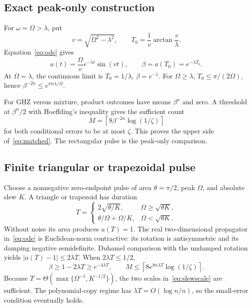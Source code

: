 \documentclass[11pt,a4paper]{article}
\begin{document}
\subsection{Exact peak-only construction}
For $\omega=\Omega>\lambda$, put
\begin{equation}
 v=\sqrt{\Omega^2-\lambda^2},\qquad
 T_0=\frac1v\arctan\frac v\lambda.
\end{equation}
Equation~\eqref{eq:ode} gives
\begin{equation}
 a(t)=\frac\Omega v e^{-\lambda t}\sin(vt),\qquad
 \boxed{\beta=a(T_0)=e^{-\lambda T_0}.}
\end{equation}
At $\Omega=\lambda$, the continuous limit is $T_0=1/\lambda$, $\beta=e^{-1}$. For $\Omega\ge\lambda$, $T_0\le\pi/(2\Omega)$, hence $\beta^{-2n}\le e^{\pi n\lambda/\Omega}$.

For GHZ versus mixture, product outcomes have means $\beta^n$ and zero. A threshold at $\beta^n/2$ with Hoeffding's inequality gives the sufficient count
\begin{equation}
 M=\left\lceil8\beta^{-2n}\log(1/\zeta)\right\rceil
 \label{eq:upper}
\end{equation}
for both conditional errors to be at most $\zeta$. This proves the upper side of~\eqref{eq:matched}. The rectangular pulse is the peak-only comparison.

\subsection{Finite triangular or trapezoidal pulse}
Choose a nonnegative zero-endpoint pulse of area $\theta=\pi/2$, peak $\Omega$, and absolute slew $K$. A triangle or trapezoid has duration
\begin{equation}
 T=
 \begin{cases}
 2\sqrt{\theta/K},&\Omega\ge\sqrt{\theta K},\\[1mm]
 \theta/\Omega+\Omega/K,&\Omega<\sqrt{\theta K}.
 \end{cases}
\end{equation}
Without noise its area produces $a(T)=1$. The real two-dimensional propagator in~\eqref{eq:ode} is Euclidean-norm contractive: its rotation is antisymmetric and its damping negative semidefinite. Duhamel comparison with the undamped rotation yields $|a(T)-1|\le2\lambda T$. When $2\lambda T\le1/2$,
\begin{equation}
 \boxed{\beta\ge1-2\lambda T\ge e^{-4\lambda T},\qquad
 M\le\left\lceil8e^{8n\lambda T}\log(1/\zeta)\right\rceil.}
\end{equation}
Because $T=\Theta(\max\{\Omega^{-1},K^{-1/2}\})$, the two scales in~\eqref{eq:slewscale} are sufficient. The polynomial-copy regime has $\lambda T=O(\log n/n)$, so the small-error condition eventually holds.
\end{document}
